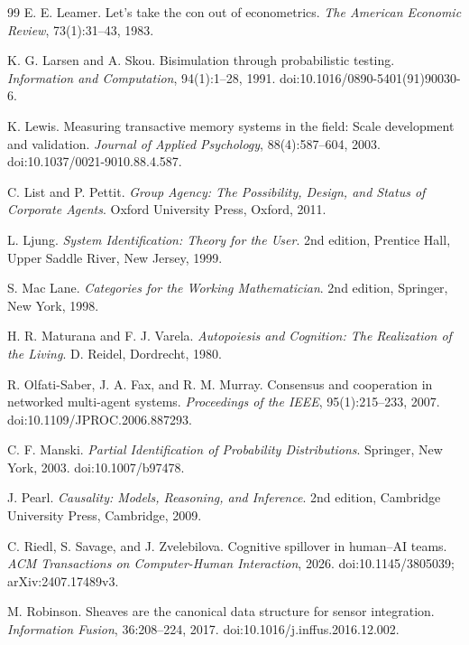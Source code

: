 \documentclass[11pt,letterpaper]{article}
\theoremstyle{plain}
\theoremstyle{definition}
\begin{document}
\begin{thebibliography}{99}
E. E. Leamer.
\newblock Let's take the con out of econometrics.
\newblock \emph{The American Economic Review}, 73(1):31--43, 1983.

K. G. Larsen and A. Skou.
\newblock Bisimulation through probabilistic testing.
\newblock \emph{Information and Computation}, 94(1):1--28, 1991.
\newblock doi:10.1016/0890-5401(91)90030-6.

K. Lewis.
\newblock Measuring transactive memory systems in the field: Scale development and validation.
\newblock \emph{Journal of Applied Psychology}, 88(4):587--604, 2003.
\newblock doi:10.1037/0021-9010.88.4.587.

C. List and P. Pettit.
\newblock \emph{Group Agency: The Possibility, Design, and Status of Corporate Agents}.
\newblock Oxford University Press, Oxford, 2011.

L. Ljung.
\newblock \emph{System Identification: Theory for the User}.
\newblock 2nd edition, Prentice Hall, Upper Saddle River, New Jersey, 1999.

S. Mac Lane.
\newblock \emph{Categories for the Working Mathematician}.
\newblock 2nd edition, Springer, New York, 1998.

H. R. Maturana and F. J. Varela.
\newblock \emph{Autopoiesis and Cognition: The Realization of the Living}.
\newblock D. Reidel, Dordrecht, 1980.

R. Olfati-Saber, J. A. Fax, and R. M. Murray.
\newblock Consensus and cooperation in networked multi-agent systems.
\newblock \emph{Proceedings of the IEEE}, 95(1):215--233, 2007.
\newblock doi:10.1109/JPROC.2006.887293.

C. F. Manski.
\newblock \emph{Partial Identification of Probability Distributions}.
\newblock Springer, New York, 2003.
\newblock doi:10.1007/b97478.

J. Pearl.
\newblock \emph{Causality: Models, Reasoning, and Inference}.
\newblock 2nd edition, Cambridge University Press, Cambridge, 2009.

C. Riedl, S. Savage, and J. Zvelebilova.
\newblock Cognitive spillover in human--AI teams.
\newblock \emph{ACM Transactions on Computer-Human Interaction}, 2026.
\newblock doi:10.1145/3805039; arXiv:2407.17489v3.

M. Robinson.
\newblock Sheaves are the canonical data structure for sensor integration.
\newblock \emph{Information Fusion}, 36:208--224, 2017.
\newblock doi:10.1016/j.inffus.2016.12.002.


\end{thebibliography}
\end{document}
